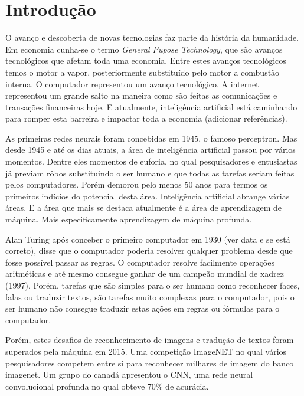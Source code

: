 \chapter{Introdução}
\label{cap:introducao}

O avanço e descoberta de novas tecnologias faz parte da história da humanidade. Em economia cunha-se o termo \textit{General Pupose Technology}, que são avanços tecnológicos que afetam toda uma economia. Entre estes avanços tecnológicos temos o motor a vapor, posteriormente substituído pelo motor a combustão interna. O computador representou um avanço tecnológico. A internet representou um grande salto na maneira como são feitas as comunicações e transações financeiras hoje. E atualmente, inteligência artificial está caminhando para romper esta barreira e impactar toda a economia (adicionar referências).

As primeiras redes neurais foram concebidas em 1945, o famoso perceptron. Mas desde 1945 e até os dias atuais, a área de inteligência artificial passou por vários momentos. Dentre eles momentos de euforia, no qual pesquisadores e entusiastas já previam rôbos substituindo o ser humano e que todas as tarefas seriam feitas pelos computadores. Porém demorou pelo menos 50 anos para termos os primeiros indícios do potencial desta área. Inteligência artificial abrange várias áreas. E a área que mais se destaca atualmente é a área de aprendizagem de máquina. Mais especificamente aprendizagem de máquina profunda.

Alan Turing após conceber o primeiro computador em 1930 (ver data e se está correto), disse que o computador poderia resolver qualquer problema desde que fosse possível passar as regras. O computador resolve facilmente operações aritméticas e até mesmo consegue ganhar de um campeão mundial de xadrez (1997). Porém, tarefas que são simples para o ser humano como reconhecer faces, falas ou traduzir textos, são tarefas muito complexas para o computador, pois o ser humano não consegue traduzir estas ações em regras ou fórmulas para o computador.

Porém, estes desafios de reconhecimento de imagens e tradução de textos foram superados pela máquina em 2015. Uma competição ImageNET no qual vários pesquisadores competem entre si para reconhecer milhares de imagem do banco imagenet. Um grupo do canadá apresentou o CNN, uma rede neural convolucional profunda no qual obteve 70\% de acurácia.


